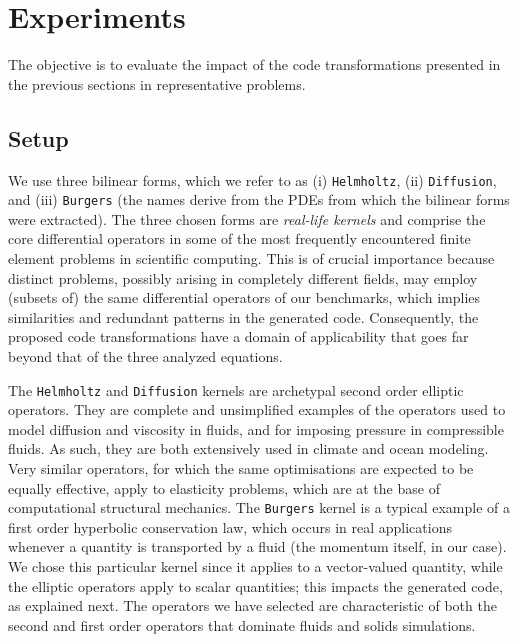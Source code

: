 \section{Experiments}
\label{sec:coffee-perfeval}
The objective is to evaluate the impact of the code transformations presented in the previous sections in representative problems.

\subsection{Setup}
We use three bilinear forms, which we refer to as (i) {\tt Helmholtz}, (ii) {\tt Diffusion}, and (iii) {\tt Burgers} (the names derive from the PDEs from which the bilinear forms were extracted). The three chosen forms are \emph{real-life kernels} and comprise the core differential operators in some of the most frequently encountered finite element problems in scientific computing. This is of crucial importance because distinct problems, possibly arising in completely different fields, may employ (subsets of) the same differential operators of our benchmarks, which implies similarities and redundant patterns in the generated code. Consequently, the proposed code transformations have a domain of applicability that goes far beyond that of the three analyzed equations.

The {\tt Helmholtz} and {\tt Diffusion} kernels are archetypal second order elliptic operators. They are complete and unsimplified examples of the operators used to model diffusion and viscosity in fluids, and for imposing pressure in compressible fluids. As such, they are both extensively used in climate and ocean modeling. Very similar operators, for which the same optimisations are expected to be equally effective, apply to elasticity problems, which are at the base of computational structural mechanics. The {\tt Burgers} kernel is a typical example of a first order hyperbolic conservation law, which occurs in real applications whenever a quantity is transported by a fluid (the momentum itself, in our case). We chose this particular kernel since it applies to a vector-valued quantity, while the elliptic operators apply to scalar quantities; this impacts the generated code, as explained next. The operators we have selected are characteristic of both the second and first order operators that dominate fluids and solids simulations.


